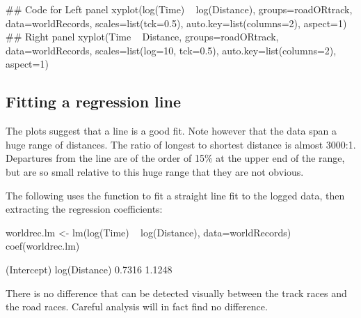 \begin{Schunk}
\begin{Sinput}
## Code for Left panel
xyplot(log(Time) ~ log(Distance),
       groups=roadORtrack, data=worldRecords,
       scales=list(tck=0.5),
       auto.key=list(columns=2), aspect=1)
## Right panel
xyplot(Time ~ Distance, groups=roadORtrack,
       data=worldRecords,
       scales=list(log=10, tck=0.5),
       auto.key=list(columns=2), aspect=1)
\end{Sinput}
\end{Schunk}
\vspace*{-9pt}

\subsection*{Fitting a regression line}

The plots suggest that a line is a good fit.  Note however that the data span a
huge range of distances.  The ratio of longest to shortest distance is
almost 3000:1. Departures from the line are of the order of 15\% at
the upper end of the range, but are so small relative to
this huge range that they are not obvious.

The following   uses the function
 to fit a straight line fit to the logged data,
then extracting the regression coefficients:
\begin{Schunk}
\begin{Sinput}
worldrec.lm <- lm(log(Time) ~ log(Distance),
                  data=worldRecords)
coef(worldrec.lm)
\end{Sinput}
\begin{Soutput}
  (Intercept) log(Distance) 
       0.7316        1.1248 
\end{Soutput}
\end{Schunk}
There is no difference that can be detected visually between the track
races and the road races.  Careful analysis will in fact find no
difference.

